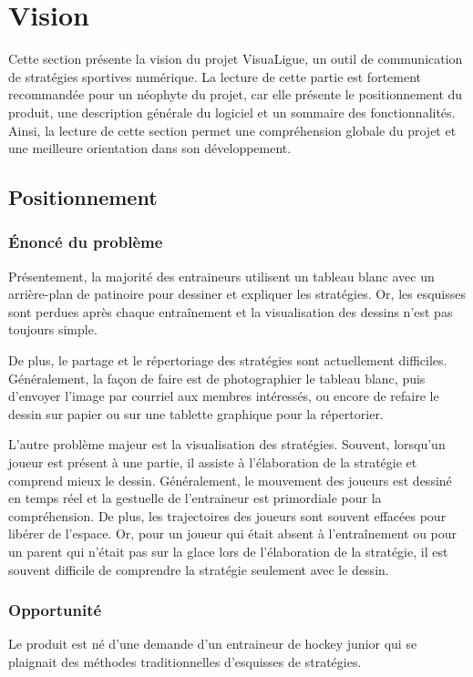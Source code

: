 \chapter{Vision}
\label{s:vision}

Cette section présente la vision du projet VisuaLigue, un outil de communication de stratégies sportives numérique. La lecture de cette partie est fortement recommandée pour un néophyte du projet, car elle présente le positionnement du produit, une description générale du logiciel et un sommaire des fonctionnalités. Ainsi, la lecture de cette section permet une compréhension globale du projet et une meilleure orientation dans son développement.

\section{Positionnement}
\subsection{Énoncé du problème}
Présentement, la majorité des entraineurs utilisent un tableau blanc avec un arrière-plan de patinoire pour dessiner et expliquer les stratégies. Or, les esquisses sont perdues après chaque entraînement et la visualisation des dessins n'est pas toujours simple.

De plus, le partage et le répertoriage des stratégies sont actuellement difficiles. Généralement, la façon de faire est de photographier le tableau blanc, puis d'envoyer l'image par courriel aux membres intéressés, ou encore de refaire le dessin sur papier ou sur une tablette graphique pour la répertorier.

L'autre problème majeur est la visualisation des stratégies. Souvent, lorsqu'un joueur est présent à une partie, il assiste à l'élaboration de la stratégie et comprend mieux le dessin. Généralement, le mouvement des joueurs est dessiné en temps réel et la gestuelle de l'entraineur est primordiale pour la compréhension. De plus, les trajectoires des joueurs sont souvent effacées pour libérer de l'espace. Or, pour un joueur qui était absent à l'entraînement ou pour un parent qui n'était pas sur la glace lors de l'élaboration de la stratégie, il est souvent difficile de comprendre la stratégie seulement avec le dessin.

\subsection{Opportunité}
Le produit est né d'une demande d'un entraineur de hockey junior qui se plaignait des méthodes traditionnelles d'esquisses de stratégies.

